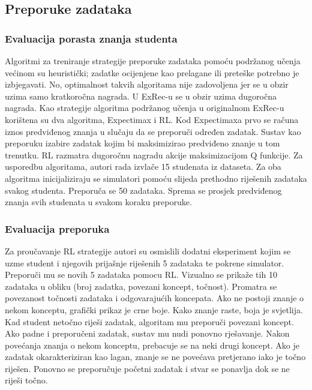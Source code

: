 \subsection{Preporuke zadataka}
\subsubsection{Evaluacija porasta znanja studenta}
Algoritmi za treniranje strategije preporuke zadataka pomoću podržanog učenja većinom su heuristički; zadatke ocijenjene kao prelagane ili preteške potrebno je izbjegavati. No, optimalnost takvih algoritama nije zadovoljena jer se u obzir uzima samo kratkoročna nagrada. U ExRec-u se u obzir uzima dugoročna nagrada. \newline
Kao strategije algoritma podržanog učenja u originalnom ExRec-u korištena su dva algoritma, Expectimax i RL. Kod Expectimaxa prvo se računa iznos predviđenog znanja u slučaju da se preporuči određen zadatak. Sustav kao preporuku izabire zadatak kojim bi maksimizirao predviđeno znanje u tom trenutku. RL razmatra dugoročnu nagradu akcije maksimizacijom Q funkcije.\newline
Za usporedbu algoritama, autori rada izvlače 15 studenata iz dataseta. Za oba algoritma inicijaliziraju se simulatori pomoću slijeda prethodno riješenih zadataka svakog studenta. Preporuča se 50 zadataka. Sprema se prosjek predviđenog znanja svih studenata u svakom koraku preporuke. %


\subsubsection{Evaluacija preporuka} %
Za proučavanje RL strategije autori su osmislili dodatni eksperiment kojim se uzme student i njegovih prijašnje riješenih 5 zadataka te pokrene simulator. Preporuči mu se novih 5 zadataka pomocu RL. Vizualno se prikaže tih 10 zadataka u obliku (broj zadatka, povezani koncept, točnost). Promatra se povezanost točnosti zadataka i odgovarajućih koncepata. Ako ne postoji znanje o nekom konceptu, grafički prikaz je crne boje. Kako znanje raste, boja je svjetlija.\newline
Kad student netočno riješi zadatak, algoritam mu preporuči povezani koncept. Ako padne i preporučeni zadatak, sustav mu nudi ponovno rješavanje.\newline
Nakon povećanja znanja o nekom konceptu, prebacuje se na neki drugi koncept. Ako je zadatak okarakteriziran kao lagan, znanje se ne povećava pretjerano iako je točno riješen.\newline
Ponovno se preporučuje početni zadatak i stvar se ponavlja dok se ne riješi točno.


